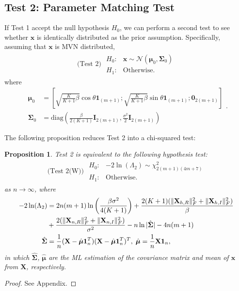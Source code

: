 \documentclass[journal,draftcls,onecolumn,12pt,twoside]{IEEEtran}
\newtheorem{proposition}{Proposition}
\begin{document}
\subsection{Test 2: Parameter Matching Test}
If Test 1 accept the null hypothesis $H_0$, we can
perform a second test to see whether $\mathbf{x}$ is identically distributed as
the prior assumption. Specifically, assuming that $\mathbf{x}$ is MVN distributed,
\begin{align}
  \mbox{(Test 2) } \begin{array}{ll}H_0: & \mathbf{x}\sim
  \mathcal{N}(\bm{\mu}_0, \mathbf{\Sigma}_0) \\ H_1: &
  \mbox{Otherwise.}
  \end{array}
\end{align}
where
\begin{subequations}
  \begin{align}
    \bm{\mu}_0 & =
    \left[\sqrt{\frac{K}{K+1}\beta}\cos\theta\mathbf{1}_{(m+1)};
    \sqrt{\frac{K}{K+1}\beta}\sin\theta\mathbf{1}_{(m+1)};
    \mathbf{0}_{2(m+1)}\right]
    \\
    \mathbf{\Sigma}_0 & =
    \mbox{diag}\left(\frac{\beta}{2(K+1)}\mathbf{I}_{2(m+1)},
    \frac{\sigma^2}{2}\mathbf{I}_{2(m+1)}\right) 
  \end{align}.
  \label{eq:mu0Sigma0}
\end{subequations}


The following proposition reduces Test 2 into a chi-squared test:
\begin{proposition}
  \label{prop:test2}
  Test 2 is equivalent to the following hypothesis test:
  \begin{align}
    \mbox{(Test 2(W)) } \begin{array}{ll}H_0: & -2\ln(\Lambda_2) \sim
    \chi_{2(m+1)(4m+7)}^2 \\ H_1: & \mbox{Otherwise.}
    \end{array}
  \end{align}
  as $n\rightarrow\infty$, where
  \begin{align}
    -2\ln(\Lambda_2) & =
    2n(m+1)\ln\left(\frac{\beta\sigma^2}{4(K+1)}\right)
    +
    \frac{2(K+1)(\|\mathbf{X}_{h,R}\|_F^2 + \|\mathbf{X}_{h,I}\|_F^2)}{\beta}
    \notag \\ &+
    \frac{2(\|\mathbf{X}_{n,R}\|_F^2 + \|\mathbf{X}_{n,I}\|_F^2)}{\sigma^2}
    - n\ln|\hat{\mathbf{\Sigma}}| - 4n(m+1)\\
    \hat{\mathbf{\Sigma}} & = \frac{1}{n}(\mathbf{X}
    -\hat{\bm{\mu}}\mathbf{1}_n^T)(\mathbf{X}
    -\hat{\bm{\mu}}\mathbf{1}_n^T)^T,\;\hat{\bm{\mu}} =
    \frac{1}{n}\mathbf{X}\mathbf{1}_n,\label{eq:sigma_mu_ml}
  \end{align}
  in which $\hat{\bm{\Sigma}}$, $\hat{\bm{\mu}}$ are the ML estimation of the
  covariance matrix and mean of $\mathbf{x}$ from $\mathbf{X}$, respectively.
\end{proposition}
\begin{proof}
  See Appendix.
\end{proof}
\end{document}
